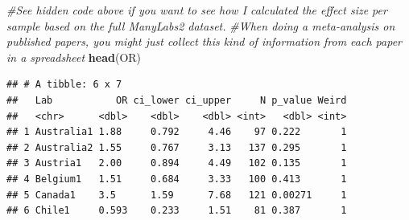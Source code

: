 \documentclass[
]{book}
\newenvironment{Shaded}{\begin{snugshade}}{\end{snugshade}}
\newcommand{\CommentTok}[1]{\textcolor[rgb]{0.56,0.35,0.01}{\textit{#1}}}
\newcommand{\DataTypeTok}[1]{\textcolor[rgb]{0.13,0.29,0.53}{#1}}
\newcommand{\DecValTok}[1]{\textcolor[rgb]{0.00,0.00,0.81}{#1}}
\newcommand{\KeywordTok}[1]{\textcolor[rgb]{0.13,0.29,0.53}{\textbf{#1}}}
\newcommand{\NormalTok}[1]{#1}
\newcommand{\OperatorTok}[1]{\textcolor[rgb]{0.81,0.36,0.00}{\textbf{#1}}}
\newcommand{\StringTok}[1]{\textcolor[rgb]{0.31,0.60,0.02}{#1}}
\begin{document}
\begin{Shaded}
\begin{Highlighting}[]
\CommentTok{#See hidden code above if you want to see how I calculated the effect size per sample based on the full ManyLabs2 dataset. }
\CommentTok{#When doing a meta-analysis on published papers, you might just collect this kind of information from each paper in a spreadsheet}
\KeywordTok{head}\NormalTok{(OR)}
\end{Highlighting}
\end{Shaded}

\begin{verbatim}
## # A tibble: 6 x 7
##   Lab           OR ci_lower ci_upper     N p_value Weird
##   <chr>      <dbl>    <dbl>    <dbl> <int>   <dbl> <int>
## 1 Australia1 1.88     0.792     4.46    97 0.222       1
## 2 Australia2 1.55     0.767     3.13   137 0.295       1
## 3 Austria1   2.00     0.894     4.49   102 0.135       1
## 4 Belgium1   1.51     0.684     3.33   100 0.413       1
## 5 Canada1    3.5      1.59      7.68   121 0.00271     1
## 6 Chile1     0.593    0.233     1.51    81 0.387       1
\end{verbatim}

\begin{Shaded}
\end{Shaded}
\end{document}
